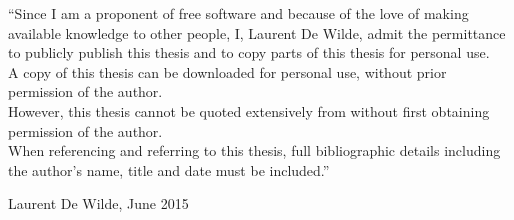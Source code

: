 \vspace{1.5cm}

\noindent
``Since I am a proponent of free software and because of the love of making available knowledge to other people, I, Laurent De Wilde, admit the permittance to publicly publish this thesis and to copy parts of this thesis for personal use. \\
A copy of this thesis can be downloaded for personal use, without prior permission of the author. \\
However, this thesis cannot be quoted extensively from without first obtaining permission of the author. \\
When referencing and referring to this thesis, full bibliographic details including the author's name, title and date must be included.''

\addvspace{4cm}

\noindent Laurent De Wilde, June 2015
